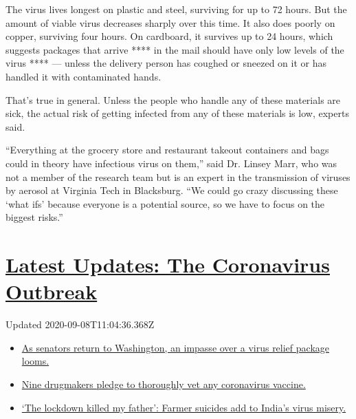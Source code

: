 The virus lives longest on plastic and steel, surviving for up to 72
hours. But the amount of viable virus decreases sharply over this time.
It also does poorly on copper, surviving four hours. On cardboard, it
survives up to 24 hours, which suggests packages that arrive **** in the
mail should have only low levels of the virus **** --- unless the
delivery person has coughed or sneezed on it or has handled it with
contaminated hands.

That's true in general. Unless the people who handle any of these
materials are sick, the actual risk of getting infected from any of
these materials is low, experts said.

``Everything at the grocery store and restaurant takeout containers and
bags could in theory have infectious virus on them,'' said Dr. Linsey
Marr, who was not a member of the research team but is an expert in the
transmission of viruses by aerosol at Virginia Tech in Blacksburg. ``We
could go crazy discussing these `what ifs' because everyone is a
potential source, so we have to focus on the biggest risks.''

\hypertarget{latest-updates-the-coronavirus-outbreak}{%
\section{\texorpdfstring{\href{https://www.nytimes3xbfgragh.onion/2020/09/08/world/covid-19-coronavirus.html?action=click\&pgtype=Article\&state=default\&region=MAIN_CONTENT_1\&context=storylines_live_updates}{Latest
Updates: The Coronavirus
Outbreak}}{Latest Updates: The Coronavirus Outbreak}}\label{latest-updates-the-coronavirus-outbreak}}

Updated 2020-09-08T11:04:36.368Z

\begin{itemize}
\tightlist
\item
  \href{https://www.nytimes3xbfgragh.onion/2020/09/08/world/covid-19-coronavirus.html?action=click\&pgtype=Article\&state=default\&region=MAIN_CONTENT_1\&context=storylines_live_updates\#link-4a77847f}{As
  senators return to Washington, an impasse over a virus relief package
  looms.}
\item
  \href{https://www.nytimes3xbfgragh.onion/2020/09/08/world/covid-19-coronavirus.html?action=click\&pgtype=Article\&state=default\&region=MAIN_CONTENT_1\&context=storylines_live_updates\#link-679303d7}{Nine
  drugmakers pledge to thoroughly vet any coronavirus vaccine.}
\item
  \href{https://www.nytimes3xbfgragh.onion/2020/09/08/world/covid-19-coronavirus.html?action=click\&pgtype=Article\&state=default\&region=MAIN_CONTENT_1\&context=storylines_live_updates\#link-1c973131}{`The
  lockdown killed my father': Farmer suicides add to India's virus
  misery.}
\end{itemize}

